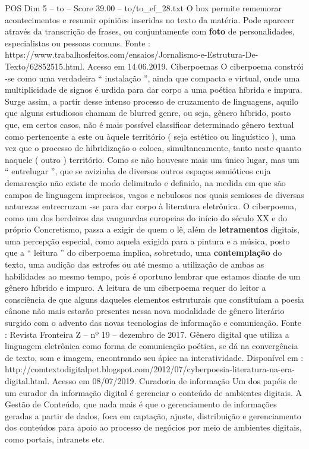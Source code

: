 \begin{textsample}{POS Dim 5 – to – Score 39.00 – to/to\_ef\_28.txt}
O box permite rememorar acontecimentos e resumir opiniões inseridas no texto da matéria.
Pode aparecer através da transcrição de frases, ou conjuntamente com \textbf{foto} de personalidades, especialistas ou pessoas comuns.
Fonte : https://www.trabalhosfeitos.com/ensaios/Jornalismo-e-Estrutura-De-Texto/62852515.html.
Acesso em 14.06.2019.
Ciberpoemas O ciberpoema constrói -se como uma verdadeira “ instalação ”, ainda que compacta e virtual, onde uma multiplicidade de signos é urdida para dar corpo a uma poética híbrida e impura.
Surge assim, a partir desse intenso processo de cruzamento de linguagens, aquilo que alguns estudiosos chamam de blurred genre, ou seja, gênero híbrido, posto que, em certos casos, não é mais possível classificar determinado gênero textual como pertencente a este ou àquele território ( seja estético ou linguístico ), uma vez que o processo de hibridização o coloca, simultaneamente, tanto neste quanto naquele ( outro ) território.
Como se não houvesse mais um único lugar, mas um “ entrelugar ”, que se avizinha de diversos outros espaços semióticos cuja demarcação não existe de modo delimitado e definido, na medida em que são campos de linguagem imprecisos, vagos e nebulosos nos quais semioses de diversas naturezas entrecruzam -se para dar corpo à literatura eletrônica.
O ciberpoema, como um dos herdeiros das vanguardas europeias do início do século XX e do próprio Concretismo, passa a exigir de quem o lê, além de \textbf{letramentos} digitais, uma percepção especial, como aquela exigida para a pintura e a música, posto que a “ leitura ” do ciberpoema implica, sobretudo, uma \textbf{contemplação} do texto, uma audição das estrofes ou até mesmo a utilização de ambas as habilidades ao mesmo tempo, pois é oportuno lembrar que estamos diante de um gênero híbrido e impuro.
A leitura de um ciberpoema requer do leitor a consciência de que alguns daqueles elementos estruturais que constituíam a poesia cânone não mais estarão presentes nessa nova modalidade de gênero literário surgido com o advento das novas tecnologias de informação e comunicação.
Fonte : Revista Fronteira Z – nº 19 – dezembro de 2017.
Gênero digital que utiliza a linguagem eletrônica como forma de comunicação poética, se dá na convergência de texto, som e imagem, encontrando seu ápice na interatividade.
Disponível em : http://comtextodigitalpet.blogspot.com/2012/07/cyberpoesia-literatura-na-era-digital.html.
Acesso em 08/07/2019.
Curadoria de informação Um dos papéis de um curador da informação digital é gerenciar o conteúdo de ambientes digitais.
A Gestão de Conteúdo, que nada mais é que o gerenciamento de informações geradas a partir de dados, foca em captação, ajuste, distribuição e gerenciamento dos conteúdos para apoio ao processo de negócios por meio de ambientes digitais, como portais, intranets etc.

\end{textsample}
